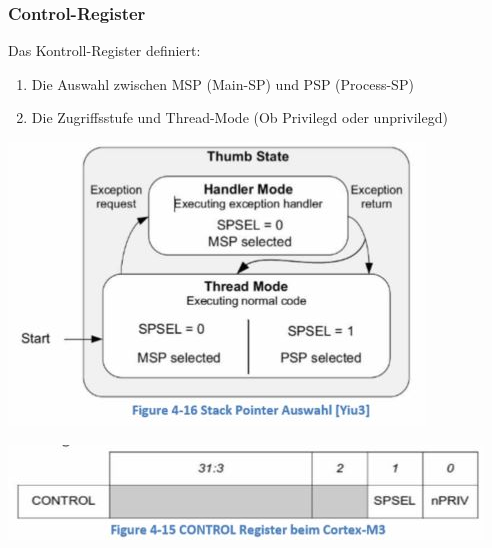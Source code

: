 \subsubsection{Control-Register}
Das Kontroll-Register definiert:
\begin{enumerate}
    \item Die Auswahl zwischen MSP (Main-SP) und PSP (Process-SP)
    \item Die Zugriffsstufe und Thread-Mode
    \subitem (Ob Privilegd oder unprivilegd)
\end{enumerate}
\begin{multicols}{2}
    \includegraphics[width=\linewidth]{images/StackPointerAuswahl}
    
    \includegraphics[width=\linewidth]{images/controlRegister}
\end{multicols}